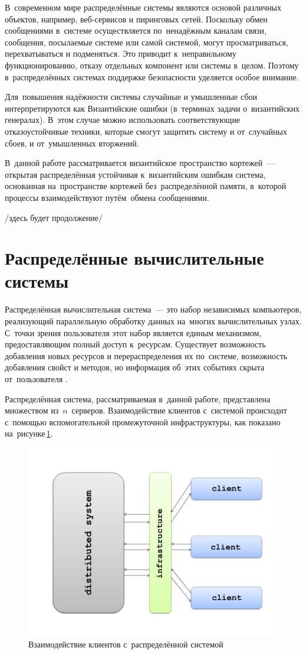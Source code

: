 


\Intro
В~современном мире распределённые системы являются основой различных объектов, например, веб-сервисов и пиринговых сетей. Поскольку обмен сообщениями в~системе осуществляется по~ненадёжным каналам связи, сообщения, посылаемые системе или самой системой, могут просматриваться, перехватываться и подменяться. Это приводит к~неправильному функционированию, отказу отдельных компонент или системы в~целом. Поэтому в~распределённых системах поддержке безопасности уделяется особое внимание.

Для~повышения надёжности системы случайные и умышленные сбои интерпретируются как Византийские ошибки (в~терминах задачи о~византийских генералах). В~этом случае можно использовать соответствующие отказоустойчивые техники, которые смогут защитить систему и от~случайных сбоев, и от~умышленных вторжений.

В~данной работе рассматривается византийское пространство кортежей~--- открытая распределённая устойчивая к~византийским ошибкам система, основанная на~пространстве кортежей без~распределённой памяти, в~которой процессы взаимодействуют путём~обмена сообщениями.

/здесь будет продолжение/

\pagebreak


\section{Распределённые вычислительные системы}\label{sec:1}
Распределённая вычислительная система~--- это набор независимых компьютеров, реализующий параллельную обработку данных на~многих вычислительных узлах. С~точки зрения пользователя этот набор является единым механизмом, предоставляющим полный доступ к~ресурсам. Существует возможность добавления новых ресурсов и перераспределения их по~системе, возможность добавления свойст и методов, но информация об~этих событиях скрыта от~пользователя \autocite{Tanenbaum}.

Распределённая система, рассматриваемая в~данной работе, представлена множеством из~$n$~серверов. Взаимодействие клиентов с~системой происходит с~помощью вспомогательной промежуточной инфраструктуры, как показано на~рисунке\,\ref{clser}.
\begin{figure}[H]
	\centering \includegraphics[width=0.7 \textwidth, height=0.5 \textwidth]{img/ClientServer}  \caption{Взаимодействие клиентов с~распределённой системой} \label{clser}
\end{figure}

